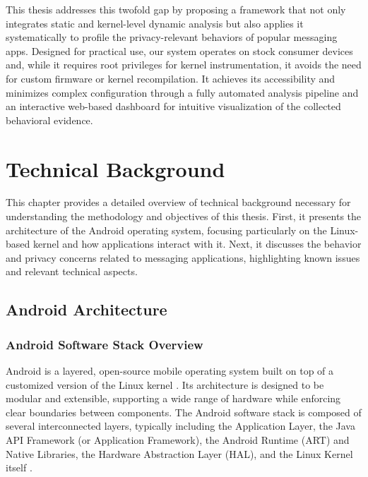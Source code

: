 \documentclass[a4paper,12pt]{report}
\begin{document}
This thesis addresses this twofold gap by proposing a framework that not only integrates static and kernel-level dynamic analysis but also applies it systematically to profile the privacy-relevant behaviors of popular messaging apps. Designed for practical use, our system operates on stock consumer devices and, while it requires root privileges for kernel instrumentation, it avoids the need for custom firmware or kernel recompilation. It achieves its accessibility and minimizes complex configuration through a fully automated analysis pipeline and an interactive web-based dashboard for intuitive visualization of the collected behavioral evidence.

\chapter{Technical Background}

This chapter provides a detailed overview of technical background necessary for understanding the methodology and objectives of this thesis. First, it presents the architecture of the Android operating system, focusing particularly on the Linux-based kernel and how applications interact with it. Next, it discusses the behavior and privacy concerns related to messaging applications, highlighting known issues and relevant technical aspects.

\section{Android Architecture}

\subsection{Android Software Stack Overview}
Android is a layered, open-source mobile operating system built on top of a customized version of the Linux kernel \cite{AOSPArchOverview}. Its architecture is designed to be modular and extensible, supporting a wide range of hardware while enforcing clear boundaries between components. The Android software stack is composed of several interconnected layers, typically including the Application Layer, the Java API Framework (or Application Framework), the Android Runtime (ART) and Native Libraries, the Hardware Abstraction Layer (HAL), and the Linux Kernel itself \cite{tanenbaum2015modern}.
\end{document}
